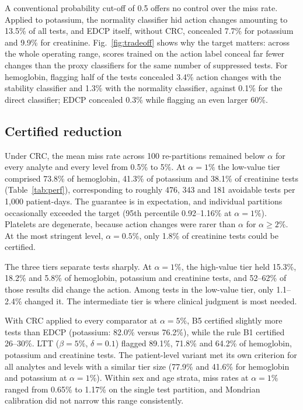 \documentclass[conference]{IEEEtran}
\begin{document}
A conventional probability cut-off of 0.5 offers no control over the miss rate. Applied to potassium, the normality classifier hid action changes amounting to 13.5\% of all tests, and EDCP itself, without CRC, concealed 7.7\% for potassium and 9.9\% for creatinine. Fig.~\ref{fig:tradeoff} shows why the target matters: across the whole operating range, scores trained on the action label conceal far fewer changes than the proxy classifiers for the same number of suppressed tests. For hemoglobin, flagging half of the tests concealed 3.4\% action changes with the stability classifier and 1.3\% with the normality classifier, against 0.1\% for the direct classifier; EDCP concealed 0.3\% while flagging an even larger 60\%.

\subsection{Certified reduction}
Under CRC, the mean miss rate across 100 re-partitions remained below $\alpha$ for every analyte and every level from 0.5\% to 5\%. At $\alpha=1\%$ the low-value tier comprised 73.8\% of hemoglobin, 41.3\% of potassium and 38.1\% of creatinine tests (Table~\ref{tab:perf}), corresponding to roughly 476, 343 and 181 avoidable tests per 1,000 patient-days. The guarantee is in expectation, and individual partitions occasionally exceeded the target (95th percentile 0.92--1.16\% at $\alpha=1\%$). Platelets are degenerate, because action changes were rarer than $\alpha$ for $\alpha\ge2\%$. At the most stringent level, $\alpha=0.5\%$, only 1.8\% of creatinine tests could be certified.

The three tiers separate tests sharply. At $\alpha=1\%$, the high-value tier held 15.3\%, 18.2\% and 5.8\% of hemoglobin, potassium and creatinine tests, and 52--62\% of those results did change the action. Among tests in the low-value tier, only 1.1--2.4\% changed it. The intermediate tier is where clinical judgment is most needed.

With CRC applied to every comparator at $\alpha=5\%$, B5 certified slightly more tests than EDCP (potassium: 82.0\% versus 76.2\%), while the rule B1 certified 26--30\%. LTT ($\beta=5\%$, $\delta=0.1$) flagged 89.1\%, 71.8\% and 64.2\% of hemoglobin, potassium and creatinine tests. The patient-level variant met its own criterion for all analytes and levels with a similar tier size (77.9\% and 41.6\% for hemoglobin and potassium at $\alpha=1\%$). Within sex and age strata, miss rates at $\alpha=1\%$ ranged from 0.65\% to 1.17\% on the single test partition, and Mondrian calibration did not narrow this range consistently.
\end{document}
